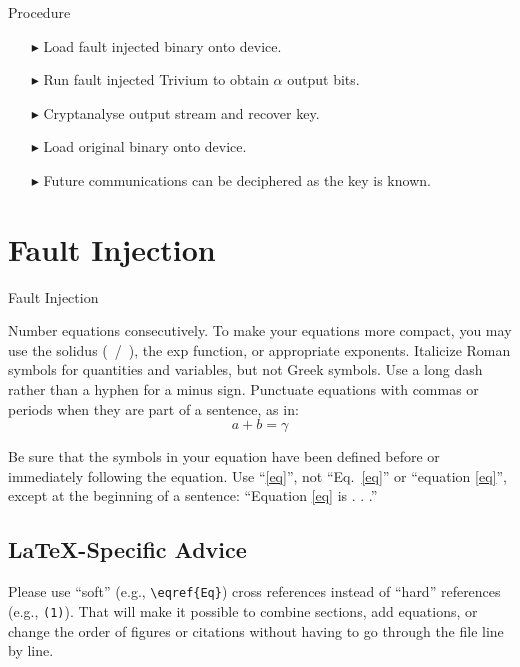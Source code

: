 \documentclass[conference]{IEEEtran}
\begin{document}
Procedure
\begin{itemize}
\item[$\blacktriangleright$] Load fault injected binary onto device.
\item[$\blacktriangleright$] Run fault injected Trivium to obtain $\alpha$ output bits.
\item[$\blacktriangleright$] Cryptanalyse output stream and recover key.
\item[$\blacktriangleright$] Load original binary onto device.
\item[$\blacktriangleright$] Future communications can be deciphered as the key is known.
\end{itemize}

\section{Fault Injection}

Fault Injection
\begin{figure}

\end{figure}











Number equations consecutively. To make your
equations more compact, you may use the solidus (~/~), the exp function, or
appropriate exponents. Italicize Roman symbols for quantities and variables,
but not Greek symbols. Use a long dash rather than a hyphen for a minus
sign. Punctuate equations with commas or periods when they are part of a
sentence, as in:
\begin{equation}
a+b=\gamma\label{eq}
\end{equation}

Be sure that the
symbols in your equation have been defined before or immediately following
the equation. Use ``\eqref{eq}'', not ``Eq.~\eqref{eq}'' or ``equation \eqref{eq}'', except at
the beginning of a sentence: ``Equation \eqref{eq} is . . .''

\subsection{\LaTeX-Specific Advice}

Please use ``soft'' (e.g., \verb|\eqref{Eq}|) cross references instead
of ``hard'' references (e.g., \verb|(1)|). That will make it possible
to combine sections, add equations, or change the order of figures or
citations without having to go through the file line by line.
\end{document}

